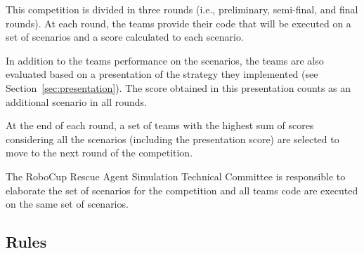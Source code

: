 \documentclass{article}
\begin{document}
This competition is divided in three rounds (i.e., preliminary, semi-final, and final rounds). At each round, the teams provide their code that will be executed on a set of scenarios and a score calculated to each scenario.

In addition to the teams performance on the scenarios, the teams are also evaluated based on a presentation of the strategy they implemented (see Section~\ref{sec:presentation}). The score obtained in this presentation counts as an additional scenario in all rounds.

At the end of each round, a set of teams with the highest sum of scores considering all the scenarios (including the presentation score) are selected to move to the next round of the competition.

The RoboCup Rescue Agent Simulation Technical Committee is responsible to elaborate the set of scenarios for the competition and all teams code are executed on the same set of scenarios.
\subsection{Rules}
\label{sec:rules}
\end{document}

